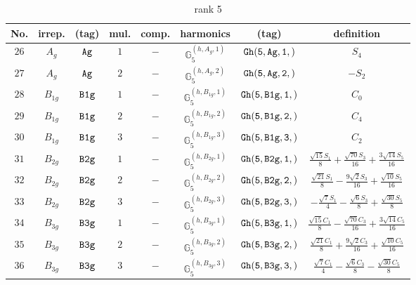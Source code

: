 \documentclass[fleqn,8pt]{jsarticle}
\begin{document}
\begin{table}[ht!]
\begin{center}
\caption{rank 5}
\renewcommand{\arraystretch}{1.3}
\begin{tabular}{cccccccc} \hline \hline
No. & irrep. & (tag) & mul. & comp. & harmonics & (tag) & definition \\ \hline
$ 26 $ & $ A_{g} $ & $ {\tt Ag} $ & $ 1 $ & $ - $ & $ \mathbb{G}_{5}^{(h,A_{g},1)} $ & $ {\tt Gh(5,Ag,1,)} $ & $ S_{4} $ \\
$ 27 $ & $ A_{g} $ & $ {\tt Ag} $ & $ 2 $ & $ - $ & $ \mathbb{G}_{5}^{(h,A_{g},2)} $ & $ {\tt Gh(5,Ag,2,)} $ & $ - S_{2} $ \\
$ 28 $ & $ B_{1g} $ & $ {\tt B1g} $ & $ 1 $ & $ - $ & $ \mathbb{G}_{5}^{(h,B_{1g},1)} $ & $ {\tt Gh(5,B1g,1,)} $ & $ C_{0} $ \\
$ 29 $ & $ B_{1g} $ & $ {\tt B1g} $ & $ 2 $ & $ - $ & $ \mathbb{G}_{5}^{(h,B_{1g},2)} $ & $ {\tt Gh(5,B1g,2,)} $ & $ C_{4} $ \\
$ 30 $ & $ B_{1g} $ & $ {\tt B1g} $ & $ 3 $ & $ - $ & $ \mathbb{G}_{5}^{(h,B_{1g},3)} $ & $ {\tt Gh(5,B1g,3,)} $ & $ C_{2} $ \\
$ 31 $ & $ B_{2g} $ & $ {\tt B2g} $ & $ 1 $ & $ - $ & $ \mathbb{G}_{5}^{(h,B_{2g},1)} $ & $ {\tt Gh(5,B2g,1,)} $ & $ \frac{\sqrt{15} S_{1}}{8} + \frac{\sqrt{70} S_{3}}{16} + \frac{3 \sqrt{14} S_{5}}{16} $ \\
$ 32 $ & $ B_{2g} $ & $ {\tt B2g} $ & $ 2 $ & $ - $ & $ \mathbb{G}_{5}^{(h,B_{2g},2)} $ & $ {\tt Gh(5,B2g,2,)} $ & $ \frac{\sqrt{21} S_{1}}{8} - \frac{9 \sqrt{2} S_{3}}{16} + \frac{\sqrt{10} S_{5}}{16} $ \\
$ 33 $ & $ B_{2g} $ & $ {\tt B2g} $ & $ 3 $ & $ - $ & $ \mathbb{G}_{5}^{(h,B_{2g},3)} $ & $ {\tt Gh(5,B2g,3,)} $ & $ - \frac{\sqrt{7} S_{1}}{4} - \frac{\sqrt{6} S_{3}}{8} + \frac{\sqrt{30} S_{5}}{8} $ \\
$ 34 $ & $ B_{3g} $ & $ {\tt B3g} $ & $ 1 $ & $ - $ & $ \mathbb{G}_{5}^{(h,B_{3g},1)} $ & $ {\tt Gh(5,B3g,1,)} $ & $ \frac{\sqrt{15} C_{1}}{8} - \frac{\sqrt{70} C_{3}}{16} + \frac{3 \sqrt{14} C_{5}}{16} $ \\
$ 35 $ & $ B_{3g} $ & $ {\tt B3g} $ & $ 2 $ & $ - $ & $ \mathbb{G}_{5}^{(h,B_{3g},2)} $ & $ {\tt Gh(5,B3g,2,)} $ & $ \frac{\sqrt{21} C_{1}}{8} + \frac{9 \sqrt{2} C_{3}}{16} + \frac{\sqrt{10} C_{5}}{16} $ \\
$ 36 $ & $ B_{3g} $ & $ {\tt B3g} $ & $ 3 $ & $ - $ & $ \mathbb{G}_{5}^{(h,B_{3g},3)} $ & $ {\tt Gh(5,B3g,3,)} $ & $ \frac{\sqrt{7} C_{1}}{4} - \frac{\sqrt{6} C_{3}}{8} - \frac{\sqrt{30} C_{5}}{8} $ \\
 \hline \hline
\end{tabular}
\end{center}
\end{table}
\end{document}
